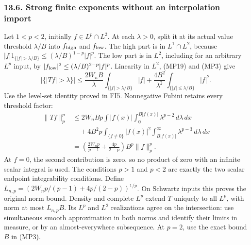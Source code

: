 \documentclass[
  11pt,
]{article}
\makeatletter
\let\ReaderOriginalAnchorStart\hyper@anchorstart
\let\ReaderOriginalAnchorEnd\hyper@anchorend
\let\ReaderPendingAliases\@empty
\def\ReaderArmAliases#1{\gdef\ReaderPendingAliases{#1}}
\def\hyper@anchorstart#1{\ReaderIfNativeAnchorTF{#1}{\ReaderPendingAliases\global\let\ReaderPendingAliases\@empty}{}\ReaderOriginalAnchorStart{#1}}
\makeatother
\begin{document}
\ReaderArmAliases{\ReaderOriginalAnchorStart{AN03-LCE-MULT-006}\ReaderOriginalAnchorEnd\begingroup\expandafter\def\csname @currentHref\endcsname{AN03-LCE-MULT-006}\label{AN03-LCE-MULT-006}\endgroup\ReaderOriginalAnchorStart{strong-finite-exponents-without-an-interpolation-import}\ReaderOriginalAnchorEnd}
\subsubsection{13.6. Strong finite exponents without an interpolation
import}\label{strong-finite-exponents-without-an-interpolation-import}

Let \(1<p<2\), initially \(f\in L^p\cap L^2\). At each \(\lambda>0\),
split it at its actual value threshold \(\lambda/B\) into
\(f_{\rm high}\) and \(f_{\rm low}\). The high part is in
\(L^1\cap L^2\), because
\(|f|1_{\{|f|>\lambda/B\}}\leq(\lambda/B)^{1-p}|f|^p\). The low part is
in \(L^2\), including for an arbitrary \(L^p\) input, by
\(|f_{\rm low}|^2\leq(\lambda/B)^{2-p}|f|^p\). Linearity in \(L^2\),
(MP19) and (MP3) give \[
 |\{|Tf|>\lambda\}|
 \leq\frac{2W_nB}{\lambda}
             \int_{\{|f|>\lambda/B\}}|f|
       +\frac{4B^2}{\lambda^2}
             \int_{\{|f|\leq\lambda/B\}}|f|^2 .
                                                               \tag{MP20}
\] Use the level-set identity proved in FI5. Nonnegative Fubini retains
every threshold factor: \[
 \begin{split}
 \|Tf\|_p^p
 &\leq2W_nBp\int|f(x)|
                    \int_0^{B|f(x)|}\lambda^{p-2}\,d\lambda\,dx\\
 &\quad+4B^2p\int_{\{f\ne0\}}|f(x)|^2
                    \int_{B|f(x)|}^{\infty}\lambda^{p-3}\,d\lambda\,dx\\
 &=\left(\frac{2W_np}{p-1}+\frac{4p}{2-p}\right)
                         B^p\|f\|_p^p .
 \end{split}                                                   \tag{MP21}
\] At \(f=0\), the second contribution is zero, so no product of zero
with an infinite scalar integral is used. The conditions \(p>1\) and
\(p<2\) are exactly the two scalar endpoint integrability conditions.
Define \(L_{n,p}=(2W_np/(p-1)+4p/(2-p))^{1/p}\). On Schwartz inputs this
proves the original norm bound. Density and complete \(L^p\) extend
\(T\) uniquely to all \(L^p\), with norm at most \(L_{n,p}B\). Its
\(L^p\) and \(L^2\) realizations agree on the intersection: use
simultaneous smooth approximation in both norms and identify their
limits in measure, or by an almost-everywhere subsequence. At \(p=2\),
use the exact bound \(B\) in (MP3).
\end{document}
